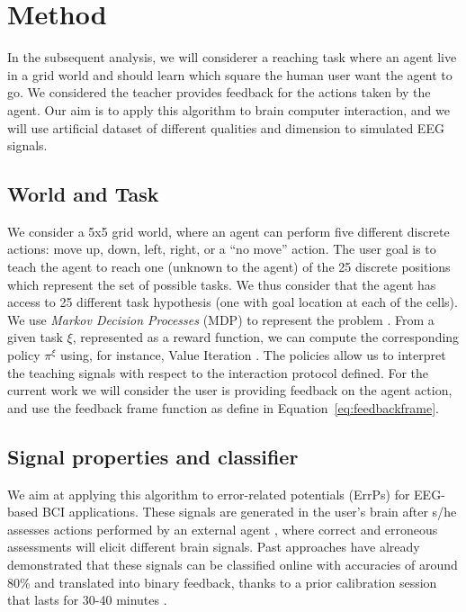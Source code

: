 \section{Method}
\label{chapter:planning:method}

In the subsequent analysis, we will considerer a reaching task where an agent live in a grid world and should learn which square the human user want the agent to go. We considered the teacher provides feedback for the actions taken by the agent. Our aim is to apply this algorithm to brain computer interaction, and we will use artificial dataset of different qualities and dimension to simulated EEG signals.

\subsection{World and Task}
We consider a 5x5 grid world, where an agent can perform five different discrete actions: move up, down, left, right, or a ``no move'' action. The user goal is to teach the agent to reach one (unknown to the agent) of the 25 discrete positions which represent the set of possible tasks. We thus consider that the agent has access to 25 different task hypothesis (one with goal location at each of the cells). We use \textit{Markov Decision Processes} (MDP) to represent the problem \cite{sutton1998reinforcement}. From a given task $\xi$, represented as a reward function, we can compute the corresponding policy $\pi^{\xi}$ using, for instance, Value Iteration \cite{sutton1998reinforcement}. The policies allow us to interpret the teaching signals with respect to the interaction protocol defined. For the current work we will consider the user is providing feedback on the agent action, and use the feedback frame function as define in Equation~\ref{eq:feedbackframe}.

\subsection{Signal properties and classifier}

We aim at applying this algorithm to error-related potentials (ErrPs) for EEG-based BCI applications. These signals are generated in the user's brain after s/he assesses actions performed by an external agent \cite{chavarriaga2010learning}, where correct and erroneous assessments will elicit different brain signals. Past approaches have already demonstrated that these signals can be classified online with accuracies of around 80\% and translated into binary feedback, thanks to a prior calibration session that lasts for 30-40 minutes \cite{chavarriaga2010learning, iturrate2013task}.

